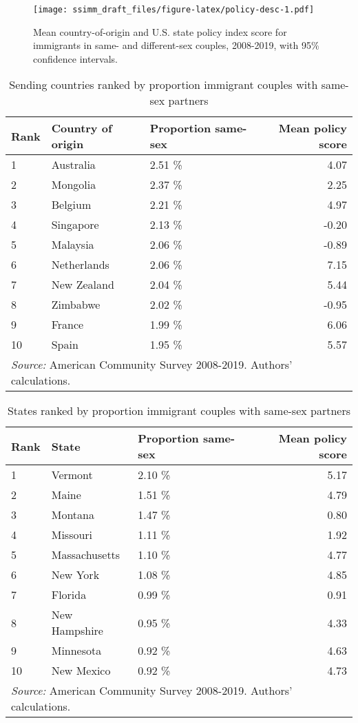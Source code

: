 \documentclass[
  11pt,
]{article}
\begin{document}
\begin{figure}
\centering
\texttt{[image: ssimm\_draft\_files/figure-latex/policy-desc-1.pdf]}
\caption{\label{fig:policy-desc}Mean country-of-origin and U.S. state policy index score for immigrants in same- and different-sex couples, 2008-2019, with 95\% confidence intervals.}
\end{figure}

\begin{table}

\caption{\label{tab:country-tab}Sending countries ranked by proportion immigrant couples with same-sex partners}
\centering
\begin{tabular}[t]{lllr}
\toprule
Rank & Country of origin & Proportion same-sex & Mean policy score\\
\midrule
1 & Australia & 2.51 \% & 4.07\\
2 & Mongolia & 2.37 \% & 2.25\\
3 & Belgium & 2.21 \% & 4.97\\
4 & Singapore & 2.13 \% & -0.20\\
5 & Malaysia & 2.06 \% & -0.89\\
6 & Netherlands & 2.06 \% & 7.15\\
7 & New Zealand & 2.04 \% & 5.44\\
8 & Zimbabwe & 2.02 \% & -0.95\\
9 & France & 1.99 \% & 6.06\\
10 & Spain & 1.95 \% & 5.57\\
\bottomrule
\multicolumn{4}{l}{\rule{0pt}{1em}\textit{Source:} American Community Survey 2008-2019. Authors' calculations.}\\
\end{tabular}
\end{table}

\begin{table}

\caption{\label{tab:state-tab}States ranked by proportion immigrant couples with same-sex partners}
\centering
\begin{tabular}[t]{lllr}
\toprule
Rank & State & Proportion same-sex & Mean policy score\\
\midrule
1 & Vermont & 2.10 \% & 5.17\\
2 & Maine & 1.51 \% & 4.79\\
3 & Montana & 1.47 \% & 0.80\\
4 & Missouri & 1.11 \% & 1.92\\
5 & Massachusetts & 1.10 \% & 4.77\\
6 & New York & 1.08 \% & 4.85\\
7 & Florida & 0.99 \% & 0.91\\
8 & New Hampshire & 0.95 \% & 4.33\\
9 & Minnesota & 0.92 \% & 4.63\\
10 & New Mexico & 0.92 \% & 4.73\\
\bottomrule
\multicolumn{4}{l}{\rule{0pt}{1em}\textit{Source:} American Community Survey 2008-2019. Authors' calculations.}\\
\end{tabular}
\end{table}
\end{document}
